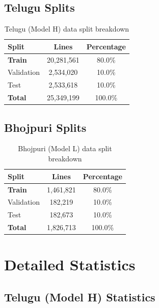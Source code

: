 \documentclass[11pt,a4paper]{article}
\begin{document}
\subsection{Telugu Splits}

\begin{table}[H]
    \centering
    \begin{tabular}{|l|c|c|}
    \hline
    \textbf{Split} & \textbf{Lines} & \textbf{Percentage} \\
    \hline
    \textbf{Train} & 20,281,561 & 80.0\% \\
    Validation & 2,534,020 & 10.0\% \\
    Test & 2,533,618 & 10.0\% \\
    \hline
    \textbf{Total} & 25,349,199 & 100.0\% \\
    \hline
    \end{tabular}
    \caption{Telugu (Model H) data split breakdown}
    \label{tab:splits_telugu}
\end{table}

\subsection{Bhojpuri Splits}

\begin{table}[H]
    \centering
    \begin{tabular}{|l|c|c|}
    \hline
    \textbf{Split} & \textbf{Lines} & \textbf{Percentage} \\
    \hline
    \textbf{Train} & 1,461,821 & 80.0\% \\
    Validation & 182,219 & 10.0\% \\
    Test & 182,673 & 10.0\% \\
    \hline
    \textbf{Total} & 1,826,713 & 100.0\% \\
    \hline
    \end{tabular}
    \caption{Bhojpuri (Model L) data split breakdown}
    \label{tab:splits_bhojpuri}
\end{table}

\section{Detailed Statistics}

\subsection{Telugu (Model H) Statistics}
\end{document}
